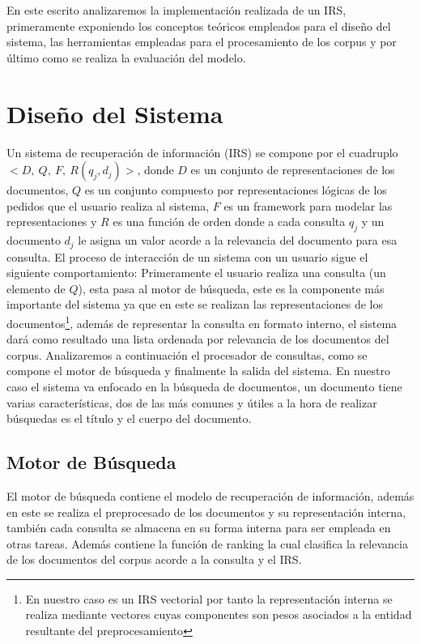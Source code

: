 \documentclass[runningheads,a4paper]{llncs}
\begin{document}
En este escrito analizaremos la implementación realizada de un IRS, primeramente exponiendo los conceptos teóricos empleados para el diseño del sistema, las herramientas empleadas para el procesamiento de los corpus y por último como se realiza la evaluación del modelo. 

\section{Diseño del Sistema}

Un sistema de recuperación de información (IRS) se compone por el cuadruplo $<D,\ Q,\ F,\ R(q_j, d_j)>$, donde $D$ es un conjunto de representaciones de los documentos, $Q$ es un conjunto compuesto por representaciones lógicas de los pedidos que el usuario realiza al sistema, $F$ es un framework para modelar las representaciones y $R$ es una función de orden donde a cada consulta $q_j$ y un documento $d_j$ le asigna un valor acorde a la relevancia del documento para esa consulta. El proceso de interacción de un sistema con un usuario sigue el siguiente comportamiento: Primeramente el usuario realiza una consulta (un elemento de $Q$), esta pasa al motor de búsqueda, este es la componente más importante del sistema ya que en este se realizan las representaciones de los documentos\footnote{En nuestro caso es un IRS vectorial por tanto la representación interna se realiza mediante vectores cuyas componentes son pesos asociados a la entidad resultante del preprocesamiento}, además de representar la consulta en formato interno, el sistema dará como resultado una lista ordenada por relevancia de los documentos del corpus. Analizaremos a continuación el procesador de consultas, como se compone el motor de búsqueda y finalmente la salida del sistema. En nuestro caso el sistema va enfocado en la búsqueda de documentos, un documento tiene varias características, dos de las más comunes y útiles a la hora de realizar búsquedas es el título y el cuerpo del documento.

\subsection*{Motor de Búsqueda}

El motor de búsqueda contiene el modelo de recuperación de información, además en este se realiza el preprocesado de los documentos y su representación interna, también cada consulta se almacena en su forma interna para ser empleada en otras tareas. Además contiene la función de ranking la cual clasifica la relevancia de los documentos del corpus acorde a la consulta y el IRS.
\end{document}
